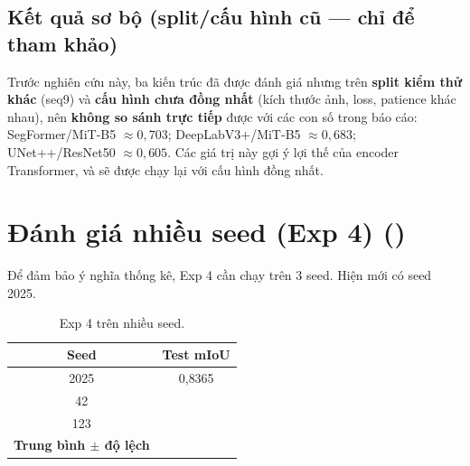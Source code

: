 \subsection*{Kết quả sơ bộ (split/cấu hình cũ --- chỉ để tham khảo)}
Trước nghiên cứu này, ba kiến trúc đã được đánh giá nhưng trên \textbf{split kiểm thử
khác} (seq9) và \textbf{cấu hình chưa đồng nhất} (kích thước ảnh, loss, patience khác
nhau), nên \textbf{không so sánh trực tiếp} được với các con số trong báo cáo:
SegFormer/MiT-B5 $\approx 0{,}703$; DeepLabV3+/MiT-B5 $\approx 0{,}683$;
UNet++/ResNet50 $\approx 0{,}605$. Các giá trị này gợi ý lợi thế của encoder
Transformer, và sẽ được chạy lại với cấu hình đồng nhất.

\section{Đánh giá nhiều seed (Exp 4) \textnormal{()}}
\label{sec:multiseed}

Để đảm bảo ý nghĩa thống kê, Exp 4 cần chạy trên 3 seed. Hiện mới có seed 2025.

\begin{table}[H]
\centering
\caption{Exp 4 trên nhiều seed.}
\label{tab:seeds}
\begin{tabular}{c c}
\toprule
\textbf{Seed} & \textbf{Test mIoU} \\
\midrule
2025 & 0{,}8365 \\
42   & \TBD{} \\
123  & \TBD{} \\
\midrule
\textbf{Trung bình $\pm$ độ lệch} & \TBD{} \\
\bottomrule
\end{tabular}
\end{table}
